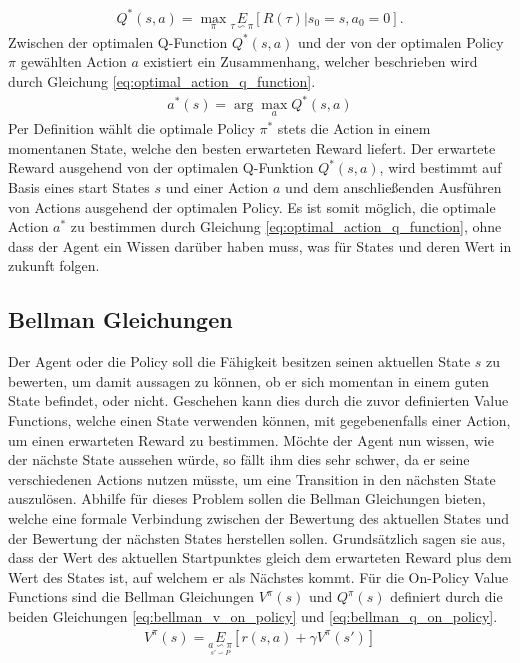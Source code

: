 \documentclass[]{iat}
\begin{document}
\begin{align}
    Q^{*}(s,a) = \underset{\pi}{\max}\underset{\tau \backsim \pi}{E}\left[R(\tau)|s_0 = s, a_0=0\right]. \label{eq:optimal_action_value_function}
\end{align}
Zwischen der optimalen Q-Function $Q^*(s,a)$ und der von der optimalen Policy $\pi$ gewählten Action $a$ existiert ein Zusammenhang, welcher beschrieben wird durch Gleichung \ref{eq:optimal_action_q_function}.
\begin{align}
    a^*(s) = \arg \max_a Q^* (s,a) \label{eq:optimal_action_q_function}
\end{align}
Per Definition wählt die optimale Policy $\pi^*$ stets die Action in einem momentanen State, welche den besten erwarteten Reward liefert. Der erwartete Reward ausgehend von der optimalen Q-Funktion $Q^*(s,a)$, wird bestimmt auf Basis eines start States $s$ und einer Action $a$ und dem anschließenden Ausführen von Actions ausgehend der optimalen Policy. Es ist somit möglich, die optimale Action $a^*$ zu bestimmen durch Gleichung \ref{eq:optimal_action_q_function}, ohne dass der Agent ein Wissen darüber haben muss, was für States und deren Wert in zukunft folgen. \cite[]{SpinningUp2018} \cite[]{Sutton1998}

\subsection{Bellman Gleichungen}
Der Agent oder die Policy soll die Fähigkeit besitzen seinen aktuellen State $s$ zu bewerten, um damit aussagen zu können, ob er sich momentan in einem guten State befindet, oder nicht. Geschehen kann dies durch die zuvor definierten Value Functions, welche einen State verwenden können, mit gegebenenfalls einer Action, um einen erwarteten Reward zu bestimmen. Möchte der Agent nun wissen, wie der nächste State aussehen würde, so fällt ihm dies sehr schwer, da er seine verschiedenen Actions nutzen müsste, um eine Transition in den nächsten State auszulösen. Abhilfe für dieses Problem sollen die Bellman Gleichungen bieten, welche eine formale Verbindung zwischen der Bewertung des aktuellen States und der Bewertung der nächsten States herstellen sollen. Grundsätzlich sagen sie aus, dass der Wert des aktuellen Startpunktes gleich dem erwarteten Reward plus dem Wert des States ist, auf welchem er als Nächstes kommt. Für die On-Policy Value Functions sind die Bellman Gleichungen $V^{\pi}(s)$ und $Q^{\pi}(s)$ definiert durch die beiden Gleichungen \ref{eq:bellman_v_on_policy} und \ref{eq:bellman_q_on_policy}.
\begin{align}
    V^{\pi}(s) = \underset{\underset{s' \backsim P}{a \backsim \pi}}{E}\left[r(s,a)+\gamma V^{\pi}(s')\right] \label{eq:bellman_v_on_policy}
\end{align}
\end{document}
